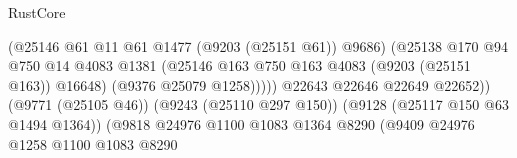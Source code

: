 \begin{lexlean}{RustCore}
\begin{coremodule}
                                                          (@25146
                                                            @61
                                                            @11
                                                            @61
                                                            @1477
                                                            (@9203 (@25151 @61))
                                                            @9686)
                                                          (@25138
                                                            @170
                                                            @94
                                                            @750
                                                            @14
                                                            @4083
                                                            @1381
                                                            (@25146
                                                              @163
                                                              @750
                                                              @163
                                                              @4083
                                                              (@9203 (@25151 @163))
                                                              @16648)
                                                            (@9376 @25079 @1258)))))
                                                    @22643
                                                    @22646
                                                    @22649
                                                    @22652))
                                                (@9771 (@25105 @46))
                                                (@9243 (@25110 @297 @150))
                                                (@9128 (@25117 @150 @63 @1494 @1364))
                                                (@9818
                                                  @24976
                                                  @1100
                                                  @1083
                                                  @1364
                                                  @8290
                                                  (@9409
                                                    @24976
                                                    @1258
                                                    @1100
                                                    @1083
                                                    @8290

\end{coremodule}
\end{lexlean}
